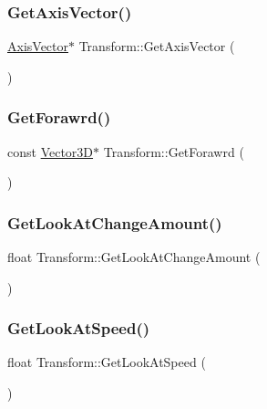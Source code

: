 \subsubsection{\texorpdfstring{Get\+Axis\+Vector()}{GetAxisVector()}}
{\footnotesize\ttfamily \mbox{\hyperlink{class_axis_vector}{Axis\+Vector}}$\ast$ Transform\+::\+Get\+Axis\+Vector (\begin{DoxyParamCaption}{ }\end{DoxyParamCaption})\hspace{0.3cm}{\ttfamily [inline]}}

\mbox{\label{class_transform_a25e4832e15334d74ff847f0ff0b3564f}} 
\subsubsection{\texorpdfstring{Get\+Forawrd()}{GetForawrd()}}
{\footnotesize\ttfamily const \mbox{\hyperlink{class_vector3_d}{Vector3D}}$\ast$ Transform\+::\+Get\+Forawrd (\begin{DoxyParamCaption}{ }\end{DoxyParamCaption})\hspace{0.3cm}{\ttfamily [inline]}}

\mbox{\label{class_transform_a14b7b06632d6a47e99dc67aecbd7acc7}} 
\subsubsection{\texorpdfstring{Get\+Look\+At\+Change\+Amount()}{GetLookAtChangeAmount()}}
{\footnotesize\ttfamily float Transform\+::\+Get\+Look\+At\+Change\+Amount (\begin{DoxyParamCaption}{ }\end{DoxyParamCaption})\hspace{0.3cm}{\ttfamily [inline]}}

\mbox{\label{class_transform_a79fdb2cb4eb1e4abf48e0f9fd74707ba}} 
\subsubsection{\texorpdfstring{Get\+Look\+At\+Speed()}{GetLookAtSpeed()}}
{\footnotesize\ttfamily float Transform\+::\+Get\+Look\+At\+Speed (\begin{DoxyParamCaption}{ }\end{DoxyParamCaption})\hspace{0.3cm}{\ttfamily [inline]}}

